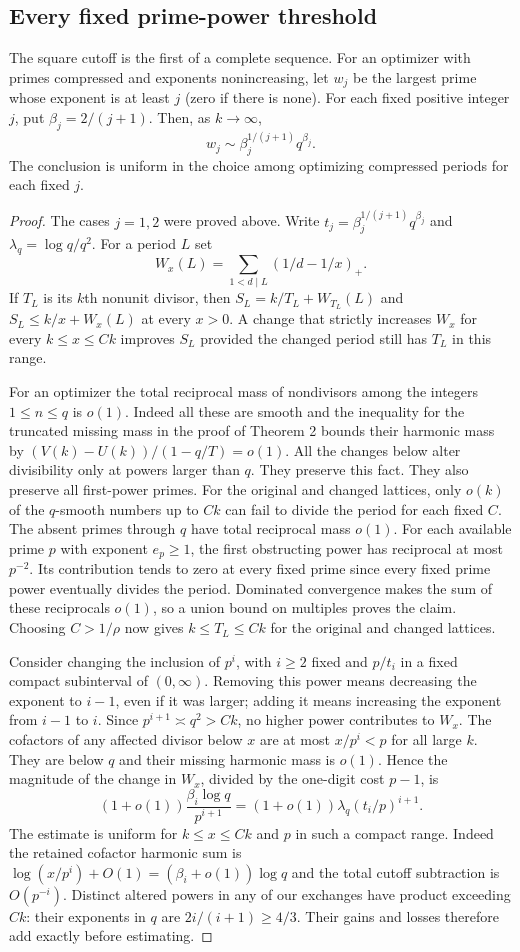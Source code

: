 \subsection*{Every fixed prime-power threshold}
The square cutoff is the first of a complete sequence. For an optimizer with primes compressed and exponents nonincreasing, let $w_j$ be the largest prime whose exponent is at least $j$ (zero if there is none). For each fixed positive integer $j$, put $\beta_j=2/(j+1)$. Then, as $k\to\infty$,
\[
                   w_j\sim \beta_j^{1/(j+1)} q^{\beta_j}.
\]
The conclusion is uniform in the choice among optimizing compressed periods for each fixed $j$.

\begin{proof}
The cases $j=1,2$ were proved above. Write $t_j=\beta_j^{1/(j+1)}q^{\beta_j}$ and $\lambda_q=\log q/q^2$. For a period $L$ set
\[
 W_x(L)=\sum_{1<d\mid L}(1/d-1/x)_+.
\]
If $T_L$ is its $k$th nonunit divisor, then $S_L=k/T_L+W_{T_L}(L)$ and $S_L\le k/x+W_x(L)$ at every $x>0$. A change that strictly increases $W_x$ for every $k\le x\le Ck$ improves $S_L$ provided the changed period still has $T_L$ in this range.

For an optimizer the total reciprocal mass of nondivisors among the integers $1\le n\le q$ is $o(1)$. Indeed all these are smooth and the inequality for the truncated missing mass in the proof of Theorem 2 bounds their harmonic mass by $(V(k)-U(k))/(1-q/T)=o(1)$. All the changes below alter divisibility only at powers larger than $q$. They preserve this fact. They also preserve all first-power primes. For the original and changed lattices, only $o(k)$ of the $q$-smooth numbers up to $Ck$ can fail to divide the period for each fixed $C$. The absent primes through $q$ have total reciprocal mass $o(1)$. For each available prime $p$ with exponent $e_p\ge1$, the first obstructing power has reciprocal at most $p^{-2}$. Its contribution tends to zero at every fixed prime since every fixed prime power eventually divides the period. Dominated convergence makes the sum of these reciprocals $o(1)$, so a union bound on multiples proves the claim. Choosing $C>1/\rho$ now gives $k\le T_L\le Ck$ for the original and changed lattices.

Consider changing the inclusion of $p^i$, with $i\ge2$ fixed and $p/t_i$ in a fixed compact subinterval of $(0,\infty)$. Removing this power means decreasing the exponent to $i-1$, even if it was larger; adding it means increasing the exponent from $i-1$ to $i$. Since $p^{i+1}\asymp q^2>Ck$, no higher power contributes to $W_x$. The cofactors of any affected divisor below $x$ are at most $x/p^i<p$ for all large $k$. They are below $q$ and their missing harmonic mass is $o(1)$. Hence the magnitude of the change in $W_x$, divided by the one-digit cost $p-1$, is
\[
 (1+o(1))\frac{\beta_i\log q}{p^{i+1}}
       =(1+o(1))\lambda_q(t_i/p)^{i+1}.
\]
The estimate is uniform for $k\le x\le Ck$ and $p$ in such a compact range. Indeed the retained cofactor harmonic sum is $\log(x/p^i)+O(1)= (\beta_i+o(1))\log q$ and the total cutoff subtraction is $O(p^{-i})$. Distinct altered powers in any of our exchanges have product exceeding $Ck$: their exponents in $q$ are $2i/(i+1)\ge4/3$. Their gains and losses therefore add exactly before estimating.


\end{proof}
